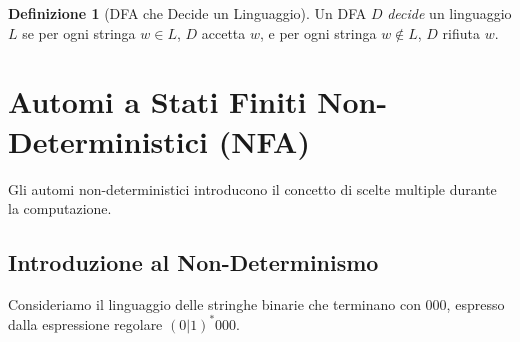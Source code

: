 \documentclass[a4paper]{article}
\theoremstyle{definition} %
\newtheorem{definition}{Definizione}[section]
\begin{document}
\begin{definition}[DFA che Decide un Linguaggio]
Un DFA $D$ \emph{decide} un linguaggio $L$ se per ogni stringa $w \in L$, $D$ accetta $w$, e per ogni stringa $w \notin L$, $D$ rifiuta $w$.
\end{definition}

\section{Automi a Stati Finiti Non-Deterministici (NFA)}
Gli automi non-deterministici introducono il concetto di scelte multiple durante la computazione.

\subsection{Introduzione al Non-Determinismo}
Consideriamo il linguaggio delle stringhe binarie che terminano con $000$, espresso dalla espressione regolare $(0|1)^*000$.
\end{document}
